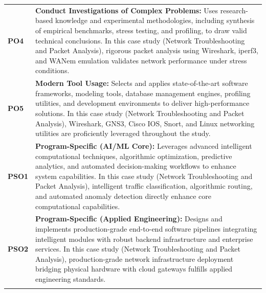 {\begin{longtable}{@{}>{\centering\arraybackslash}p{1.8cm} p{13.2cm}@{}}
    \addlinespace
\textbf{PO4} & \textbf{Conduct Investigations of Complex Problems:} Uses research-based knowledge and experimental methodologies, including synthesis of empirical benchmarks, stress testing, and profiling, to draw valid technical conclusions. In this case study (Network Troubleshooting and Packet Analysis), rigorous packet analysis using Wireshark, iperf3, and WANem emulation validates network performance under stress conditions. \\
    \addlinespace
\textbf{PO5} & \textbf{Modern Tool Usage:} Selects and applies state-of-the-art software frameworks, modeling tools, database management engines, profiling utilities, and development environments to deliver high-performance solutions. In this case study (Network Troubleshooting and Packet Analysis), Wireshark, GNS3, Cisco IOS, Snort, and Linux networking utilities are proficiently leveraged throughout the study. \\
    \addlinespace
\textbf{PSO1} & \textbf{Program-Specific (AI/ML Core):} Leverages advanced intelligent computational techniques, algorithmic optimization, predictive analytics, and automated decision-making workflows to enhance system capabilities. In this case study (Network Troubleshooting and Packet Analysis), intelligent traffic classification, algorithmic routing, and automated anomaly detection directly enhance core computational capabilities. \\
    \addlinespace
\textbf{PSO2} & \textbf{Program-Specific (Applied Engineering):} Designs and implements production-grade end-to-end software pipelines integrating intelligent modules with robust backend infrastructure and enterprise services. In this case study (Network Troubleshooting and Packet Analysis), production-grade network infrastructure deployment bridging physical hardware with cloud gateways fulfills applied engineering standards. \\
    \addlinespace
    \bottomrule
\end{longtable}}